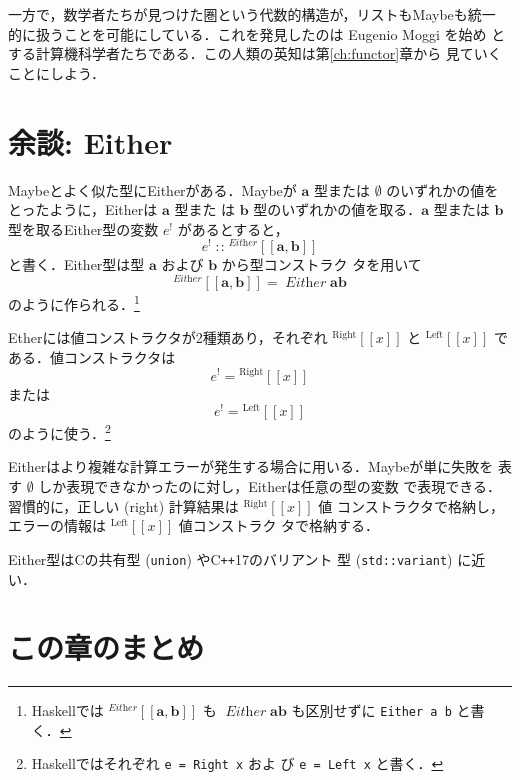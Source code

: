 \documentclass[a5paper,twoside,fleqn]{jsbook}
\def\[{\left[\!\left[}
\def\]{\right]\!\right]}
\newcommand{\programminglanguage}[1]{\textsf{#1}}
\newcommand{\clang}{\programminglanguage{C}}
\newcommand{\cxx}{\programminglanguage{C}\texttt{++}}
\newcommand{\cxxseventeen}{\cxx\programminglanguage{17}}
\newcommand{\haskell}{\programminglanguage{Haskell}}
\newcommand{\code}[1]{\texttt{#1}}
\newcommand{\mNothing}{\emptyset}
\DeclareMathOperator{\mIn}{{:\!:}}
\newcommand{\mSpecialSub}[1]{\text{#1}}
\newcommand{\mLeft}{\mSpecialSub{Left}}
\newcommand{\mRight}{\mSpecialSub{Right}}
\newcommand{\mType}[1]{\mathbf{#1}}
\newcommand{\mGenericTypeAssembleII}[3]{{}^{\mTypeConstructor{#1}}\[\mType{#2},\mType{#3}\]}
\newcommand{\mEitherType}[2]{\mGenericTypeAssembleII{Either}{#1}{#2}}
\newcommand{\mTypeConstructor}[1]{\textit{#1}}
\DeclareMathOperator{\mEitherTypeConstructor}{\mTypeConstructor{Either}}
\newcommand{\mGenericValueConstructor}[1]{\mathrm{#1}}
\newcommand{\mGenericWith}[2]{{}^\mGenericValueConstructor{#1}\[#2\]}
\newcommand{\mLeftWith}[1]{\mGenericWith{\mLeft}{#1}}
\newcommand{\mRightWith}[1]{\mGenericWith{\mRight}{#1}}
\newcommand{\mEither}[1]{{#1}^!}
\begin{document}

一方で，数学者たちが見つけた圏という代数的構造が，リストもMaybeも統一
的に扱うことを可能にしている．これを発見したのは Eugenio Moggi を始め
とする計算機科学者たちである．この人類の英知は第\ref{ch:functor}章から
見ていくことにしよう．

\section{余談: Either}

Maybeとよく似た型にEitherがある．Maybeが $\mType{a}$ 型または
$\mNothing$ のいずれかの値をとったように，Eitherは $\mType{a}$ 型また
は $\mType{b}$ 型のいずれかの値を取る．$\mType{a}$ 型または
$\mType{b}$ 型を取るEither型の変数 $\mEither{e}$ があるとすると，
\begin{equation}
\mEither{e}\mIn{}\mEitherType{a}{b}
\end{equation}
と書く．Either型は型 $\mType{a}$ および $\mType{b}$ から型コンストラク
タを用いて
\begin{equation}
\mEitherType{a}{b}=\mEitherTypeConstructor\mType{a}\mType{b}
\end{equation}
のように作られる．\footnote{\haskell では $\mEitherType{a}{b}$ も
  $\mEitherTypeConstructor\mType{a}\mType{b}$ も区別せずに
  \code{Either a b} と書く．}

Etherには値コンストラクタが2種類あり，それぞれ $\mRightWith{x}$ と
$\mLeftWith{x}$ である．値コンストラクタは
\begin{equation}
\mEither{e}=\mRightWith{x}
\end{equation}
または
\begin{equation}
\mEither{e}=\mLeftWith{x}
\end{equation}
のように使う．\footnote{\haskell ではそれぞれ \code{e = Right x} およ
  び \code{e = Left x} と書く．}

Eitherはより複雑な計算エラーが発生する場合に用いる．Maybeが単に失敗を
表す $\mNothing$ しか表現できなかったのに対し，Eitherは任意の型の変数
で表現できる．習慣的に，正しい (right) 計算結果は $\mRightWith{x}$ 値
コンストラクタで格納し，エラーの情報は $\mLeftWith{x}$ 値コンストラク
タで格納する．

Either型は\clang の共有型 (\code{union}) や\cxxseventeen のバリアント
型 (\code{std::variant}) に近い．

\section{この章のまとめ}
\end{document}
